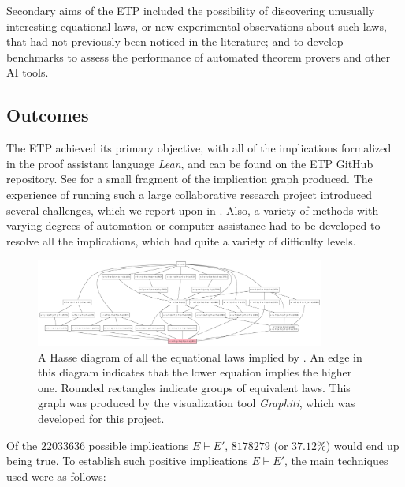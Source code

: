 Secondary aims of the ETP included the possibility of discovering unusually interesting equational laws, or new experimental observations about such laws, that had not previously been noticed in the literature; and to develop benchmarks to assess the performance of automated theorem provers and other AI tools.

\subsection{Outcomes}

The ETP achieved its primary objective, with all of the implications formalized in the proof assistant language \emph{Lean}, and can be found on the ETP GitHub repository.  See  for a small fragment of the implication graph produced. The experience of running such a large collaborative research project introduced several challenges, which we report upon in . Also, a variety of methods with varying degrees of automation or computer-assistance had to be developed to resolve all the implications, which had quite a variety of difficulty levels.

\begin{figure}
\centering
\includegraphics[width=0.85\textwidth]{854.png}
\caption{A Hasse diagram of all the equational laws implied by .  An edge in this diagram indicates that the lower equation implies the higher one. Rounded rectangles indicate groups of equivalent laws.  This graph was produced by the visualization tool \emph{Graphiti}, which was developed for this project.}
\label{fig:854}
\end{figure}


Of the $22033636$ possible implications $E \vdash E'$, $8178279$ (or $37.12\%$) would end up being true. To establish such positive implications $E \vdash E'$, the main techniques used were as follows:

